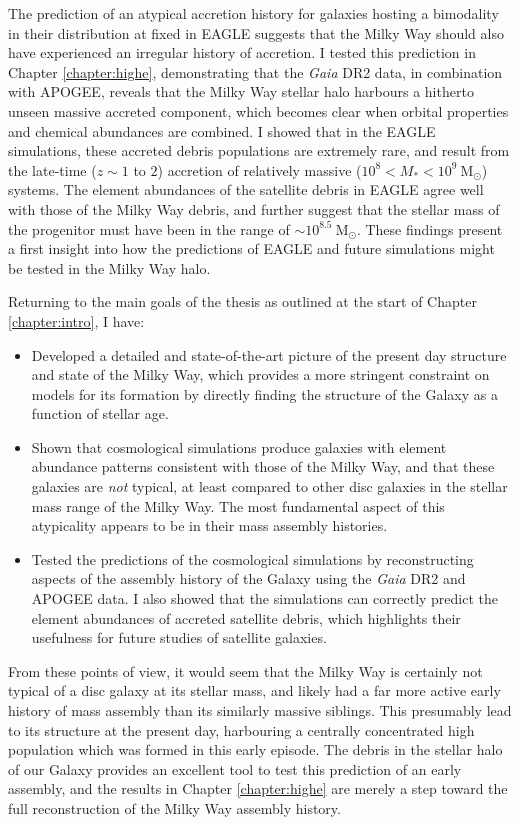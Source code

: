 The prediction of an atypical accretion history for galaxies hosting a bimodality in their \afe{} distribution at fixed \feh{} in EAGLE suggests that the Milky Way should also have experienced an irregular history of accretion. I tested this prediction in Chapter \ref{chapter:highe}, demonstrating that the \emph{Gaia} DR2 data, in combination with APOGEE, reveals that the Milky Way stellar halo harbours a hitherto unseen massive accreted component, which becomes clear when orbital properties and chemical abundances are combined. I showed that in the EAGLE simulations, these accreted debris populations are extremely rare, and result from the late-time ($z\sim 1$ to $2$) accretion of relatively massive ($10^{8} < M_{*} < 10^{9}\ \mathrm{M_{\odot}}$) systems. The element abundances of the satellite debris in EAGLE agree well with those of the Milky Way debris, and further suggest that the stellar mass of the progenitor must have been in the range of $\sim 10^{8.5}\ \mathrm{M_{\odot}}$. These findings present a first insight into how the predictions of EAGLE and future simulations might be tested in the Milky Way halo.

Returning to the main goals of the thesis as outlined at the 
start of Chapter \ref{chapter:intro}, I have:
\begin{itemize}
    \item Developed a detailed and state-of-the-art picture of the present day structure and state of the Milky Way, which provides a more stringent constraint on models for its formation by directly finding the structure of the Galaxy as a function of stellar age.
    \item Shown that cosmological simulations produce galaxies with element abundance patterns consistent with those of the Milky Way, and that these galaxies are \emph{not} typical, at least compared to other disc galaxies in the stellar mass range of the Milky Way. The most fundamental aspect of this atypicality appears to be in their mass assembly histories.
    \item Tested the predictions of the cosmological simulations by reconstructing aspects of the assembly history of the Galaxy using the \emph{Gaia} DR2 and APOGEE data. I also showed that the simulations can correctly predict the element abundances of accreted satellite debris, which highlights their usefulness for future studies of satellite galaxies.
\end{itemize}
From these points of view, it would seem that the Milky Way is certainly not typical of a disc galaxy at its stellar mass, and likely had a far more active early history of mass assembly than its similarly massive siblings. This presumably lead to its structure at the present day, harbouring a centrally concentrated high \afe{} population which was formed in this early episode. The debris in the stellar halo of our Galaxy provides an excellent tool to test this prediction of an early assembly, and the results in Chapter \ref{chapter:highe} are merely a step toward the full reconstruction of the Milky Way assembly history.


